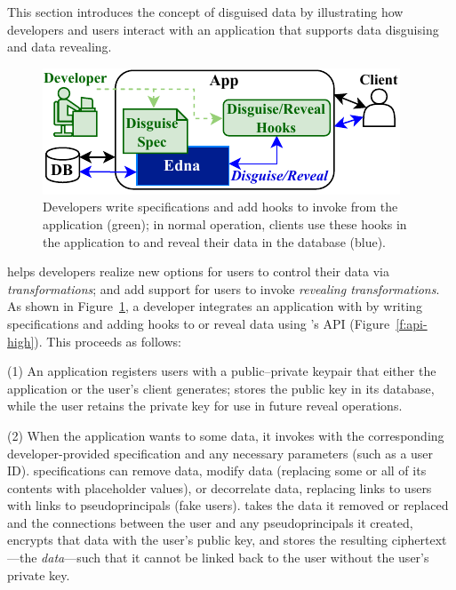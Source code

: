 This section introduces the concept of disguised data by illustrating how
developers and users interact with an application that supports 
data disguising and data revealing.
%

\begin{figure}[h!]
  \centering
    \includegraphics{figs/edna_overview}
    \caption[Developers write disguise specifications and add hooks to invoke Edna's API.]{Developers write \xx specifications and add hooks to invoke \sys
        from the application (green); in normal operation, clients use these
        hooks in the application to \xx and reveal their data in the database
        (blue).
    }
  \label{f:edna-overview}
\end{figure}
%
\sys helps developers realize new options for users to control their data
via \emph{\xxing transformations}; and add support for users to invoke
\emph{revealing transformations}.
%
As shown in Figure~\ref{f:edna-overview}, a developer integrates an application
with \sys by writing \xx specifications and adding hooks to \xx or reveal data
using \sys's API (Figure~\ref{f:api-high}).
%
This proceeds as follows:
%

%
(1) An application registers users with a public--private keypair
that either the application or the user's client generates; \sys stores the
public key in its database, while the user retains the private key for use in
future reveal operations.
%

%
(2) When the application wants to \xx some data, it invokes \sys with the
corresponding developer-provided \xx specification and any necessary
parameters (such as a user ID).
%
\Xx specifications can remove data, modify data (replacing some or all of its
contents with placeholder values), or decorrelate data, replacing
links to users with links to pseudoprincipals (fake users).
%
%
\sys takes the data it removed or replaced and the connections between
the user and any pseudoprincipals it created, encrypts that data with the user's
public key, and stores the resulting ciphertext---the \emph{\xxed
data}---such that it cannot be linked back to the user without the user's
private key.
%
%



